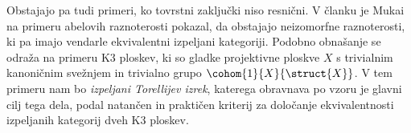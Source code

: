 Obstajajo pa tudi primeri, ko tovrstni zaključki niso resnični. V članku \cite{Mukai1981} je Mukai na primeru abelovih raznoterosti pokazal, da obstajajo neizomorfne raznoterosti, ki pa imajo vendarle ekvivalentni izpeljani kategoriji. Podobno obnašanje se odraža na primeru K3 ploskev, ki so gladke projektivne ploskve $X$ s trivialnim kanoničnim svežnjem in trivialno grupo $\cohom{1}{X}{\struct{X}}$. V tem primeru nam bo \emph{izpeljani Torellijev izrek}, katerega obravnava po vzoru \cite{Orlov2003} je glavni cilj tega dela, podal natančen in praktičen kriterij za določanje ekvivalentnosti izpeljanih kategorij dveh K3 ploskev.








